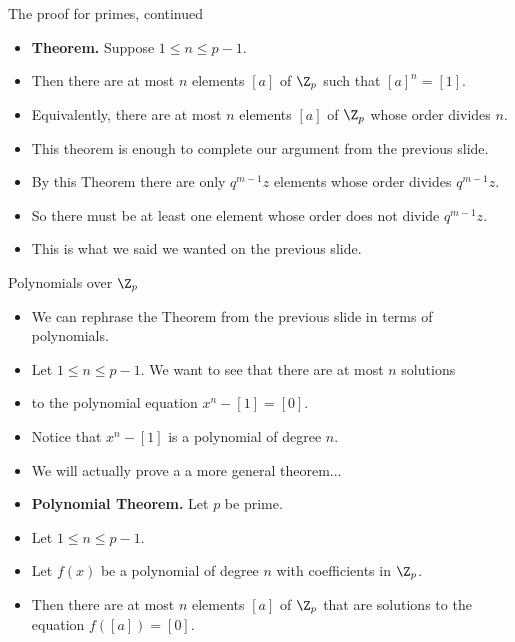 \documentclass{beamer}
\begin{document}
\begin{frame}{The proof for primes, continued}

\begin{itemize}
  \item \textbf{Theorem.} Suppose $1\leq n \leq p-1$.
  \item Then there are at most $n$ elements $[a]$ of $\Z_p$ such that $[a]^n = [1]$.
  \item Equivalently, there are at most $n$ elements $[a]$ of $\Z_p$ whose order divides $n$.
  \item This theorem is enough to complete our argument from the previous slide.
  \item By this Theorem there are only $q^{m-1}z$ elements whose order divides $q^{m-1}z$.
  \item So there must be at least one element whose order does not divide $q^{m-1}z$.
  \item This is what we said we wanted on the previous slide.
\end{itemize}

\end{frame}

\begin{frame}{Polynomials over $\Z_p$}

\begin{itemize}
  \item We can rephrase the Theorem from the previous slide in terms of polynomials.
  \item Let $1\leq n \leq p-1$. We want to see that there are at most $n$ solutions
  \item to the polynomial equation $x^n-[1] = [0]$.
  \item Notice that $x^n-[1]$ is a polynomial of degree $n$.
  \item We will actually prove a a more general theorem...
  \item \textbf{Polynomial Theorem.} Let $p$ be prime.
  \item Let $1\leq n \leq p-1$.
  \item Let $f(x)$ be a polynomial of degree $n$ with coefficients in $\Z_p$.
  \item Then there are at most $n$ elements $[a]$ of $\Z_p$ that are solutions to
  the equation $f([a])=[0]$.
\end{itemize}

\end{frame}
\end{document}
